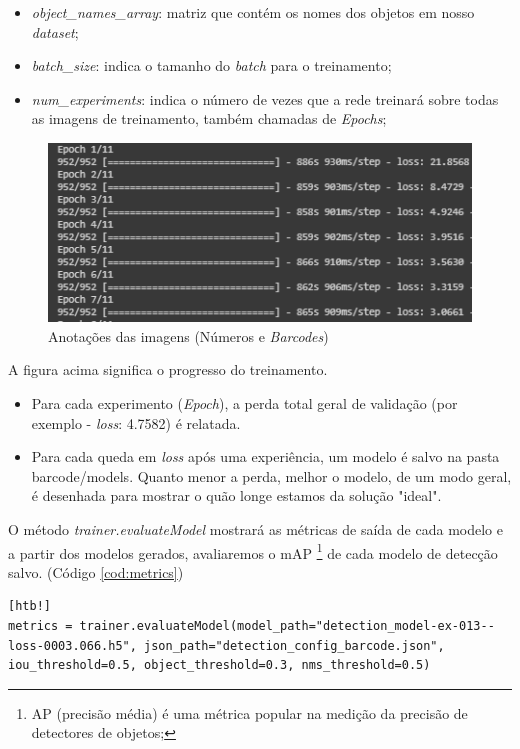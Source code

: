 \begin{itemize}
    \item \textit{object\_names\_array}: matriz que contém os nomes dos objetos em nosso \textit{dataset};
    \item \textit{batch\_size}: indica o tamanho do \textit{batch} para o treinamento;
    \item \textit{num\_experiments}: indica o número de vezes que a rede treinará sobre todas as imagens de treinamento, também chamadas de \textit{Epochs};
\end{itemize}

\begin{figure}[htbp]
	\centering
	\includegraphics[width=1\linewidth]{figuras/MachineLearning/barcodeTraining.png}
	\caption{Anotações das imagens (Números e \textit{Barcodes})}
	\label{fig:barTrain}
\end{figure}

    A figura acima significa o progresso do treinamento.
\begin{itemize}
    \item Para cada experimento (\textit{Epoch}), a perda total geral de validação (por exemplo - \textit{loss}: 4.7582) é relatada.
    \item Para cada queda em \textit{loss} após uma experiência, um modelo é salvo na pasta barcode/models. Quanto menor a perda, melhor o modelo, de um modo geral, é desenhada para mostrar o quão longe estamos da solução "ideal". 
\end{itemize}

O método \textit{trainer.evaluateModel} mostrará as métricas de saída de cada modelo e a partir dos modelos gerados, avaliaremos o mAP \footnote{AP (precisão média) é uma métrica popular na medição da precisão de detectores de objetos;} de cada modelo de detecção salvo.  (Código \ref{cod:metrics})

\begin{lstlisting}[caption=Métricas de saída do modelo, label=cod:metrics][htb!]
metrics = trainer.evaluateModel(model_path="detection_model-ex-013--loss-0003.066.h5", json_path="detection_config_barcode.json", iou_threshold=0.5, object_threshold=0.3, nms_threshold=0.5)
\end{lstlisting}

